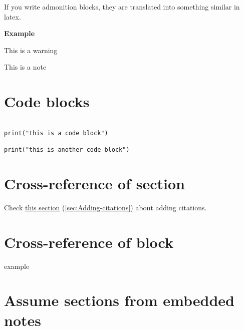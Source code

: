 \documentclass{extarticle}
\begin{document}
If you write admonition blocks, they are translated into something similar in latex.

\textbf{Example}

\begin{tcolorbox}[width=1.0\textwidth,colback={red},title={warning},outer arc=0mm,colupper=white]

This is a warning

\end{tcolorbox}



\begin{tcolorbox}[width=1.0\textwidth,colback={white},title={note},outer arc=0mm,colupper=black]

This is a note

\end{tcolorbox}





\section{Code blocks}

\begin{verbatim}

print("this is a code block")

print("this is another code block")

\end{verbatim}



\section{Cross-reference of section}

Check \hyperref[sec:Adding-citations]{this section} (\autoref{sec:Adding-citations}) about adding citations.





\section{\maltese Cross-reference of block}

example



\section{Assume sections from embedded notes}
\end{document}
